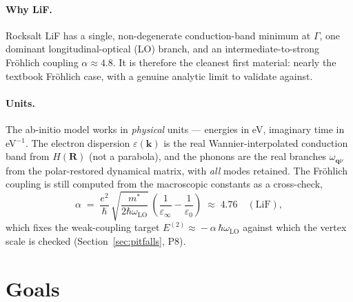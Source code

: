 \documentclass[11pt]{article}
\newcommand{\kv}{\mathbf{k}}
\newcommand{\qv}{\mathbf{q}}
\newcommand{\Rv}{\mathbf{R}}
\begin{document}
\paragraph{Why LiF.}
Rocksalt LiF has a single, non-degenerate conduction-band minimum at $\Gamma$, one
dominant longitudinal-optical (LO) branch, and an intermediate-to-strong Fr\"ohlich
coupling $\alpha\approx4.8$. It is therefore the cleanest first material: nearly the
textbook Fr\"ohlich case, with a genuine analytic limit to validate against.

\paragraph{Units.}
The ab-initio model works in \emph{physical} units --- energies in eV, imaginary time in
eV$^{-1}$. The electron dispersion $\varepsilon(\kv)$ is the real Wannier-interpolated
conduction band from $H(\Rv)$ (not a parabola), and the phonons are the real branches
$\omega_{\qv\nu}$ from the polar-restored dynamical matrix, with \emph{all} modes retained.
The Fr\"ohlich coupling is still computed from the macroscopic constants as a cross-check,
\begin{equation}
  \alpha \;=\; \frac{e^{2}}{\hbar}\,
  \sqrt{\frac{m^{*}}{2\hbar\omega_{\mathrm{LO}}}}\,
  \left(\frac{1}{\varepsilon_{\infty}}-\frac{1}{\varepsilon_{0}}\right)
  \;\approx\; 4.76\quad(\text{LiF}),
  \label{eq:alpha}
\end{equation}
which fixes the weak-coupling target $E^{(2)}\!\approx\!-\alpha\,\hbar\omega_{\mathrm{LO}}$
against which the vertex scale is checked (Section~\ref{sec:pitfalls}, P8).

\section{Goals}
\label{sec:goals}
\end{document}
